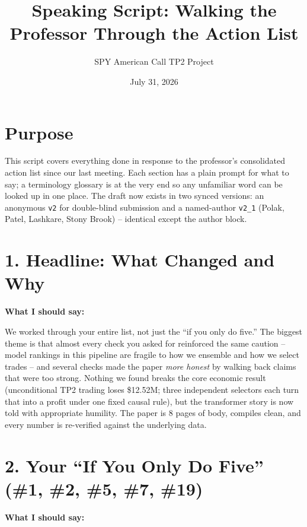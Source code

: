 \documentclass[11pt]{article}
\title{Speaking Script: Walking the Professor Through the Action List}
\author{SPY American Call TP2 Project}
\date{July 31, 2026}
\begin{document}
\sloppy
\maketitle

\section*{Purpose}
This script covers everything done in response to the professor's consolidated action list since our last meeting. Each section has a plain prompt for what to say; a terminology glossary is at the very end so any unfamiliar word can be looked up in one place. The draft now exists in two synced versions: an anonymous \texttt{v2} for double-blind submission and a named-author \texttt{v2\_1} (Polak, Patel, Lashkare, Stony Brook) -- identical except the author block.

\section*{1. Headline: What Changed and Why}
\textbf{What I should say:}

We worked through your entire list, not just the ``if you only do five.'' The biggest theme is that almost every check you asked for reinforced the same caution -- model rankings in this pipeline are fragile to how we ensemble and how we select trades -- and several checks made the paper \emph{more honest} by walking back claims that were too strong. Nothing we found breaks the core economic result (unconditional TP2 trading loses \$12.52M; three independent selectors each turn that into a profit under one fixed causal rule), but the transformer story is now told with appropriate humility. The paper is 8 pages of body, compiles clean, and every number is re-verified against the underlying data.

\section*{2. Your ``If You Only Do Five'' (\#1, \#2, \#5, \#7, \#19)}
\textbf{What I should say:}
\end{document}
